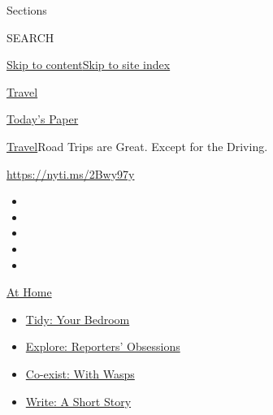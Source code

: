Sections

SEARCH

\protect\hyperlink{site-content}{Skip to
content}\protect\hyperlink{site-index}{Skip to site index}

\href{https://www.nytimes3xbfgragh.onion/section/travel}{Travel}

\href{https://myaccount.nytimes3xbfgragh.onion/auth/login?response_type=cookie\&client_id=vi}{}

\href{https://www.nytimes3xbfgragh.onion/section/todayspaper}{Today's
Paper}

\href{/section/travel}{Travel}\textbar{}Road Trips are Great. Except for
the Driving.

\url{https://nyti.ms/2Bwy97y}

\begin{itemize}
\item
\item
\item
\item
\item
\end{itemize}

\href{https://www.nytimes3xbfgragh.onion/spotlight/at-home?action=click\&pgtype=Article\&state=default\&module=STORY_MAPS_ATH_promo\&region=TOP_BANNER\&context=at_home_menu}{At
Home}

\begin{itemize}
\tightlist
\item
  \href{https://www.nytimes3xbfgragh.onion/interactive/2020/07/20/burst/bedroom-organization-tips.html?action=click\&pgtype=Article\&state=default\&module=STORY_MAPS_ATH_promo\&region=TOP_BANNER\&context=at_home_menu}{Tidy:
  Your Bedroom}
\item
  \href{https://www.nytimes3xbfgragh.onion/interactive/2020/at-home/even-more-reporters-editors-diaries-lists-recommendations.html?action=click\&pgtype=Article\&state=default\&module=STORY_MAPS_ATH_promo\&region=TOP_BANNER\&context=at_home_menu}{Explore:
  Reporters' Obsessions}
\item
  \href{https://www.nytimes3xbfgragh.onion/article/paper-wasps-yellowjackets.html?action=click\&pgtype=Article\&state=default\&module=STORY_MAPS_ATH_promo\&region=TOP_BANNER\&context=at_home_menu}{Co-exist:
  With Wasps}
\item
  \href{https://www.nytimes3xbfgragh.onion/2020/07/18/at-home/coronavirus-fiction-writing.html?action=click\&pgtype=Article\&state=default\&module=STORY_MAPS_ATH_promo\&region=TOP_BANNER\&context=at_home_menu}{Write:
  A Short Story}
\end{itemize}


